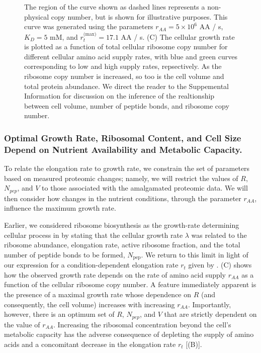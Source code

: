 {\begin{figure}
{{        The region of the curve shown as dashed lines represents a non-physical
        copy number, but is shown for illustrative purposes. This curve was
        generated using the parameters $r_{AA} = 5 \times 10^6$ AA / s, $K_D =
        5$ mM, and $r_t^\text{(max)} = 17.1$ AA / s. (C) The cellular growth
        rate is plotted as a function of total cellular ribosome copy number for
        different cellular amino acid supply rates, with blue and green curves
        corresponding to low and high supply rates, repsectively. As the
        ribosome copy number is increased, so too is the cell volume and total
        protein abundance. We direct the reader to the Suppemental Information
        for discussion  on the inference of the realtionship between cell
        volume, number of peptide bonds, and ribosome copy number.}
        \label{fig:elongation_rate_model}
    }
\end{figure}

\subsubsection{Optimal Growth Rate, Ribosomal Content, and Cell Size Depend on Nutrient
Availability and Metabolic Capacity.}

To relate the elongation rate to growth rate, we constrain  the set of
parameters based on measured proteomic changes; namely, we will restrict the
values of $R$, $N_{pep}$, and $V$ to those associated with the amalgamated
proteomic data. We will then consider how changes in the nutrient conditions,
through the parameter $r_{AA}$, influence the maximum growth rate.

Earlier, we considered ribosome biosynthesis as the growth-rate determining
cellular process in  by stating that the cellular growth rate
$\lambda$ was related to the ribosome abundance, elongation rate, active
ribosome fraction, and the total number of peptide bonds to be formed,
$N_\text{pep}$. We return to this limit in light of our expression for a
condition-dependent elongation rate $r_t$ given by .
(C) shows how the observed growth rate depends on the
rate of amino acid supply $r_{AA}$ as a function of the cellular ribosome copy
number. A feature immediately apparent is the presence of a maximal growth rate
whose dependence on $R$ (and consequently, the cell volume) increases with
increasing $r_{AA}$. Importantly, however, there is an optimum set of $R$,
$N_{pep}$, and $V$ that are strictly dependent on the value of $r_{AA}$.
Increasing the ribosomal concentration beyond the cell's metabolic capacity has
the adverse consequence of depleting the supply of amino acids and a concomitant
decrease in the elongation rate $r_t$ [(B)].

}

